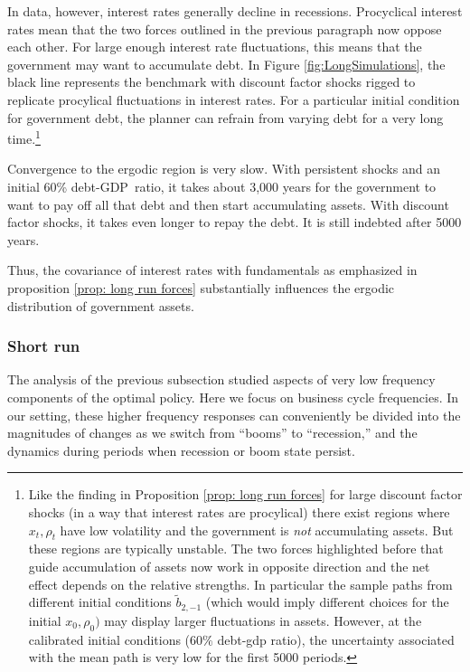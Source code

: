\documentclass[thmsb,11pt]{article}
\begin{document}
{In data, however, interest rates  generally decline in recessions. Procyclical interest rates mean that the
two forces outlined in the previous paragraph now oppose each other.  For  large enough interest rate fluctuations, this means that
the
government may want to accumulate debt. In Figure \ref{fig:LongSimulations}, the
black line represents the benchmark with discount factor shocks rigged to
replicate  procylical fluctuations in interest rates. For a particular initial condition for government debt,
the planner can refrain from varying debt for a very  long time.\footnote{Like the finding in Proposition \ref{prop: long run forces} for large discount factor shocks (in a way that interest rates are procylical)  there exist
regions where $x_t,\rho_t$ have low volatility and the  government is \emph{not} accumulating assets. But these
regions  are typically unstable. The two forces highlighted before that guide accumulation of assets now work in opposite direction and the net effect depends
on the relative strengths. In particular the sample paths from different initial conditions $\tilde{b}_{2,-1}$ (which would imply different choices for the initial $x_0,\rho_0)$ may display larger fluctuations in assets. However, at the calibrated initial conditions ($60\%$ debt-gdp ratio), the uncertainty associated with the mean path is very low for the first 5000 periods.} 


Convergence to the ergodic region is  very slow.  With persistent shocks and an initial 60\% debt-GDP\ ratio,  it takes about 3,000 years for
the government to want to pay off all that debt
and then start accumulating assets. With
discount factor shocks, it takes even longer to repay the debt. It is still indebted after 5000 years.

Thus, the covariance of interest rates with fundamentals as emphasized in proposition \ref{prop: long run forces} substantially influences the ergodic distribution of government assets.

\subsubsection{Short run}

The analysis of the previous subsection studied  aspects of very low
frequency components of  the optimal policy. Here  we focus on business cycle frequencies.
 In our setting,  these higher frequency responses can conveniently be divided  into the magnitudes of changes as we switch from ``booms''
to ``recession,'' and the dynamics during  periods when recession or boom state persist.

}
\end{document}
